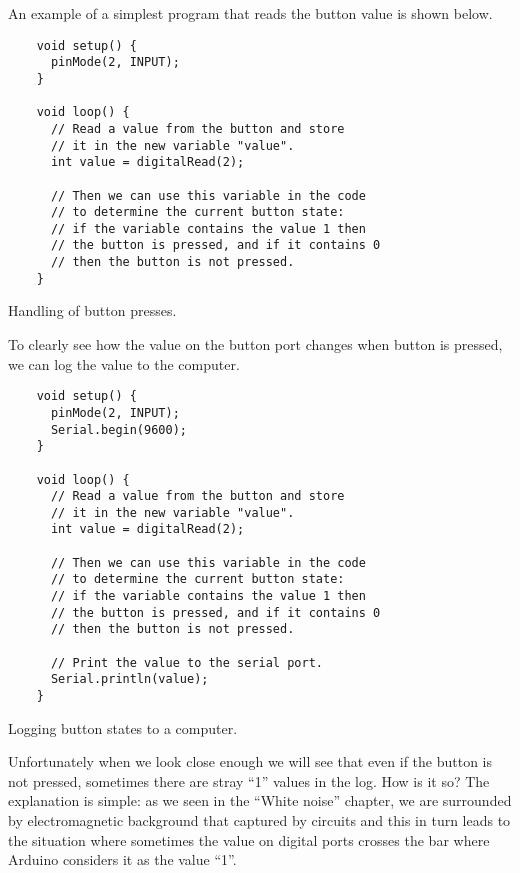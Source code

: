 \documentclass[../sparc.tex]{subfiles}
\begin{document}

An example of a simplest program that reads the button value is shown below.

\begin{listing}[H]
  \begin{verbatim}
    void setup() {
      pinMode(2, INPUT);
    }

    void loop() {
      // Read a value from the button and store
      // it in the new variable "value".
      int value = digitalRead(2);

      // Then we can use this variable in the code
      // to determine the current button state:
      // if the variable contains the value 1 then
      // the button is pressed, and if it contains 0
      // then the button is not pressed.
    }
  \end{verbatim}
  \caption{Handling of button presses.}
  \label{listing:button-00}
\end{listing}

To clearly see how the value on the button port changes when button is pressed,
we can log the value to the computer.

\begin{listing}[H]
  \begin{verbatim}
    void setup() {
      pinMode(2, INPUT);
      Serial.begin(9600);
    }

    void loop() {
      // Read a value from the button and store
      // it in the new variable "value".
      int value = digitalRead(2);

      // Then we can use this variable in the code
      // to determine the current button state:
      // if the variable contains the value 1 then
      // the button is pressed, and if it contains 0
      // then the button is not pressed.

      // Print the value to the serial port.
      Serial.println(value);
    }
  \end{verbatim}
  \caption{Logging button states to a computer.}
  \label{listing:button-01}
\end{listing}

Unfortunately when we look close enough we will see that even if the button is
not pressed, sometimes there are stray ``1'' values in the log.  How is it so?
The explanation is simple: as we seen in the ``White noise'' chapter, we are
surrounded by electromagnetic background that captured by circuits and this in
turn leads to the situation where sometimes the value on digital ports crosses
the bar where Arduino considers it as the value ``1''.
\end{document}
